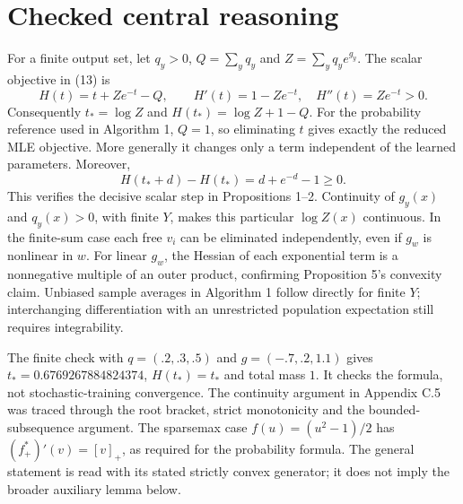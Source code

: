 \documentclass[10pt]{article}
\begin{document}
\section*{Checked central reasoning}
For a finite output set, let \(q_y>0\), \(Q=\sum_yq_y\) and \(Z=\sum_yq_y e^{g_y}\). The scalar objective in (13) is \[H(t)=t+Ze^{-t}-Q,\qquad H'(t)=1-Ze^{-t},\quad H''(t)=Ze^{-t}>0.\] Consequently \(t_* =\log Z\) and \(H(t_*)=\log Z+1-Q\). For the probability reference used in Algorithm 1, \(Q=1\), so eliminating \(t\) gives exactly the reduced MLE objective. More generally it changes only a term independent of the learned parameters. Moreover, \[H(t_*+d)-H(t_*)=d+e^{-d}-1\geq0.\] This verifies the decisive scalar step in Propositions 1–2. Continuity of \(g_y(x)\) and \(q_y(x)>0\), with finite \(Y\), makes this particular \(\log Z(x)\) continuous. In the finite-sum case each free \(v_i\) can be eliminated independently, even if \(g_w\) is nonlinear in \(w\). For linear \(g_w\), the Hessian of each exponential term is a nonnegative multiple of an outer product, confirming Proposition 5’s convexity claim. Unbiased sample averages in Algorithm 1 follow directly for finite \(Y\); interchanging differentiation with an unrestricted population expectation still requires integrability.\par
The finite check with \(q=(.2,.3,.5)\) and \(g=(-.7,.2,1.1)\) gives \(t_*=0.6769267884824374\), \(H(t_*)=t_*\) and total mass \(1\). It checks the formula, not stochastic-training convergence. The continuity argument in Appendix C.5 was traced through the root bracket, strict monotonicity and the bounded-subsequence argument. The sparsemax case \(f(u)=(u^2-1)/2\) has \((f_+^*)'(v)=[v]_+\), as required for the probability formula. The general statement is read with its stated strictly convex generator; it does not imply the broader auxiliary lemma below.\par
\end{document}

